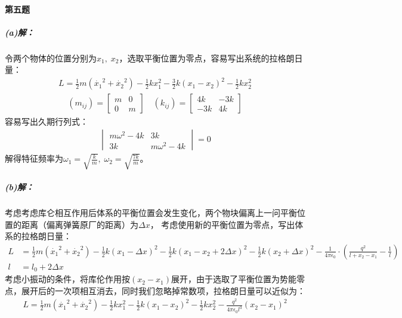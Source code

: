 \documentclass[a4paper]{ctexart}
\begin{document}
    \paragraph{第五题}
    \subparagraph{(a)解：}
    令两个物体的位置分别为$x_{1},\;x_{2}$，选取平衡位置为零点，容易写出系统的拉格朗日量：
    \begin{align}
        L = \frac{1}{2}m(\dot{x_{1}}^{2} + \dot{x_{2}}^{2}) - \frac{1}{2}kx_{1}^{2} - \frac{3}{2}k(x_{1} - x_{2})^{2} - \frac{1}{2}kx_{2}^{2}
    \end{align}
    \begin{gather}
    (m_{ij}) = 
        \begin{bmatrix}
            m & 0\\
            0 & m
        \end{bmatrix}
        \quad
    (k_{ij}) = 
        \begin{bmatrix}
            4k & -3k\\
            -3k & 4k
        \end{bmatrix}
    \end{gather}
    容易写出久期行列式：
    \begin{gather}
    \begin{vmatrix}
        m\omega^{2} - 4k & 3k\\
        3k & m\omega^{2} - 4k
    \end{vmatrix}
    =0
    \end{gather}
    解得特征频率为$\omega_{1} = \sqrt{\frac{k}{m}},\;\omega_{2} = \sqrt{\frac{7k}{m}}$。
    \subparagraph{(b)解：}
    考虑考虑库仑相互作用后体系的平衡位置会发生变化，两个物块偏离上一问平衡位置的距离（偏离弹簧原厂的距离）为$\Delta x$，
    考虑使用新的平衡位置为零点，写出体系的拉格朗日量：
    \begin{align}
        L &= \frac{1}{2}m(\dot{x_{1}}^{2} + \dot{x_{2}}^{2}) - \frac{1}{2}k(x_{1} - \Delta x)^{2} - \frac{1}{2}k(x_{1} - x_{2} + 2\Delta x)^{2} - \frac{1}{2}k(x_{2} + \Delta x)^{2} - \frac{1}{4\pi\epsilon_{0}}\cdot\left(\frac{q^{2}}{l + x_{2} - x_{1}} - \frac{1}{l}\right)\\
        l &= l_{0} + 2\Delta x
    \end{align}
    考虑小振动的条件，将库伦作用按$(x_{2} - x_{1})$展开，由于选取了平衡位置为势能零点，展开后的一次项相互消去，同时我们忽略掉常数项，拉格朗日量可以近似为：
    \begin{align}
        L = \frac{1}{2}m(\dot{x_{1}}^{2} + \dot{x_{2}}^{2}) - \frac{1}{2}kx_{1}^{2} - \frac{1}{2}k(x_{1} - x_{2})^{2} - \frac{1}{2}kx_{2}^{2} - \frac{q^{2}}{4\pi\epsilon_{0}l^{3}}(x_{2} - x_{1})^{2}
    \end{align}
\end{document}
